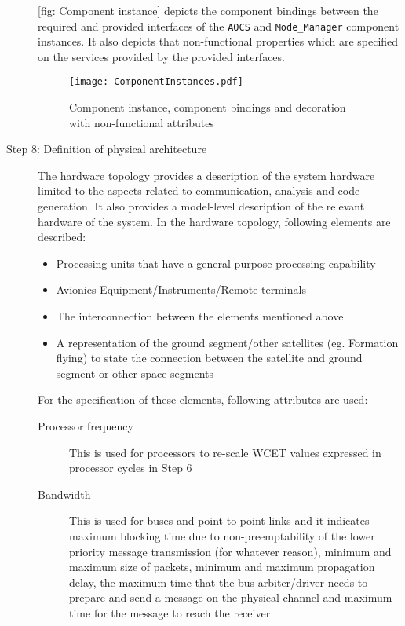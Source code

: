 \begin{description}
\cref{fig: Component instance} depicts the component bindings between the required and provided interfaces of the \texttt{AOCS} and \texttt{Mode\_Manager} component instances. It also depicts that non-functional properties which are specified on the services provided by the provided interfaces.

\begin{figure}[h]
	\centering
	\texttt{[image: ComponentInstances.pdf]}
	\caption{Component instance, component bindings and decoration with non-functional attributes}
	\label{fig: Component instances}
\end{figure}

\item [Step 8: Definition of physical architecture] The hardware topology provides a description of the system hardware limited to the aspects related to communication, analysis and code generation. It also provides a model-level description of the relevant hardware of the system. In the hardware topology, following elements are described:
\begin{itemize}
\item Processing units that have a general-purpose processing capability
\item Avionics Equipment/Instruments/Remote terminals
\item The interconnection between the elements mentioned above 
\item A representation of the ground segment/other satellites (eg. Formation flying) to state the connection between the satellite and ground segment or other space segments
\end{itemize}		
For the specification of these elements, following attributes are used:
\begin{description}
\item [Processor frequency] This is used for processors to re-scale WCET values expressed in processor cycles in Step 6
\item [Bandwidth] This is used for buses and point-to-point links and it indicates maximum blocking time due to non-preemptability of the lower priority message transmission (for whatever reason), minimum and maximum size of packets, minimum and maximum propagation delay, the maximum time that the bus arbiter/driver needs to prepare and send a message on the physical channel and maximum time for the message to reach the receiver    
\end{description}


\end{description}

